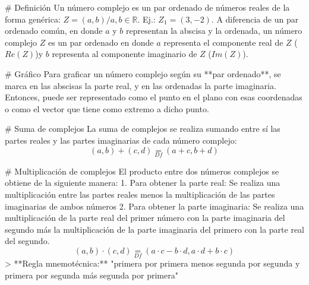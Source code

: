 # Definición
Un número complejo es un par ordenado de números reales de la forma genérica: $Z=(a,b)/a,b \in \mathbb{R}$. Ej.: $Z_1=(3,-2).$
A diferencia de un par ordenado común, en donde $a$ y $b$ representan la abscisa y la ordenada, un número complejo $Z$ es un par ordenado en donde $a$ representa el componente real de $Z$ ($Re(Z)$)y $b$ representa al componente imaginario de $Z$ ($Im(Z)$).

# Gráfico
Para graficar un número complejo según su **par ordenado**, se marca en las abscisas la parte real, y en las ordenadas la parte imaginaria. Entonces, puede ser representado como el punto en el plano con esas coordenadas o como el vector que tiene como extremo a dicho punto.

# Suma de complejos
La suma de complejos se realiza sumando entre sí las partes reales y las partes imaginarias de cada número complejo:
$$ (a,b) + (c,d)\underset{Df}{=}(a+c,b+d) $$

# Multiplicación de complejos
El producto entre dos números complejos se obtiene de la siguiente manera:
1. Para obtener la parte real: Se realiza una multiplicación entre las partes reales menos la multiplicación de las partes imaginarias de ambos números
2. Para obtener la parte imaginaria: Se realiza una multiplicación de la parte real del primer número con la parte imaginaria del segundo más la multiplicación de la parte imaginaria del primero con la parte real del segundo.
$$(a,b)\cdot(c,d) \underset{Df}{=} (a\cdot c-b\cdot d,a\cdot d + b\cdot c) $$
> **Regla mnemotécnica:** "primera por primera menos segunda por segunda y primera por segunda más segunda por primera"



